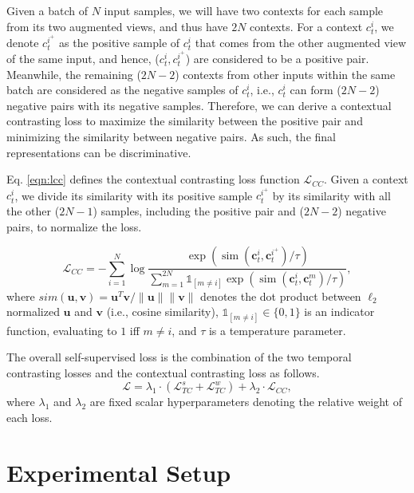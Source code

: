 \documentclass{article}
\begin{document}
Given a batch of $N$ input samples, we will have two contexts for each sample from its two augmented views, and thus have $2N$ contexts. 
For a context $c_t^i$, we denote $c_t^{i^+}$ as the positive sample of $c_t^{i}$ that comes from the other augmented view of the same input, and hence, ($c_t^i, c_t^{i^+}$) are considered to be a positive pair.  
Meanwhile, the remaining ($2N-2$) contexts from other inputs within the same batch are considered as the negative samples of $c_t^i$, i.e., $c_t^i$ can form ($2N-2$) negative pairs with its negative samples. Therefore, we can derive a contextual contrasting loss to maximize the similarity between the positive pair and minimizing the similarity between negative pairs. As such, the final representations can be discriminative. 

Eq. \ref{eqn:lcc} defines the contextual contrasting loss function $\mathcal{L}_{CC}$. Given a context $c_t^i$, we divide its similarity with its positive sample $c_t^{i^+}$ by its similarity with all the other ($2N - 1$) samples, including the positive pair and ($2N - 2$) negative pairs, to normalize the loss. 

\begin{equation}
    \mathcal{L}_{CC}= -\sum_{i=1}^{N} \log \frac{\exp \left(\operatorname{sim}\left(\boldsymbol{c}_t^{i}, \boldsymbol{c}_t^{i^+}\right) / \tau\right)}{\sum_{m=1}^{2 N} \mathbb{1}_{[m \neq i]} \exp \left(\operatorname{sim}\left(\boldsymbol{c}_t^{i}, \boldsymbol{c}_t^{m}\right) / \tau\right)},
    \label{eqn:lcc}
\end{equation}
where $sim(\bm u,\bm v) = \bm u^T \bm v/ \| \bm u\|\| \bm v\| $ denotes the dot product between $\ell_2$ normalized $\bm u$ and $\bm v$ (i.e., cosine similarity), $\mathbb{1}_{[m \neq i]} \in \{0,1\}$ is an indicator function, evaluating to $1$ iff $m \neq i$, and $\tau$ is a temperature parameter.

The overall self-supervised loss is the combination of the two temporal contrasting losses and the contextual contrasting loss as follows.
\begin{equation}
    \mathcal{L} = \lambda_1 \cdot (\mathcal{L}_{TC}^s + \mathcal{L}_{TC}^w ) + \lambda_2 \cdot \mathcal{L}_{CC},
    \label{eq:overall}
\end{equation}
where $\lambda_1$ and $\lambda_2$ are fixed scalar hyperparameters denoting the relative weight of each loss.


\section{Experimental Setup}
\end{document}
